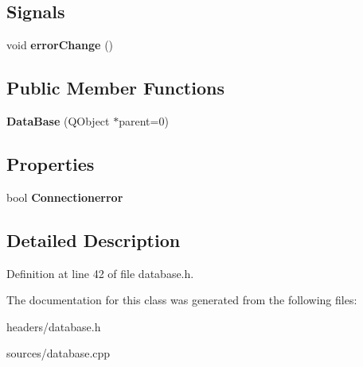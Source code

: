 \subsection*{Signals}
\begin{DoxyCompactItemize}
\item 
\mbox{\label{class_data_base_a8890efbd2c70b08529079cd2b45c85ba}} 
void {\bfseries error\+Change} ()
\end{DoxyCompactItemize}
\subsection*{Public Member Functions}
\begin{DoxyCompactItemize}
\item 
\mbox{\label{class_data_base_af4276b07c4049897ecbfe4842d25ba02}} 
{\bfseries Data\+Base} (Q\+Object $\ast$parent=0)
\end{DoxyCompactItemize}
\subsection*{Properties}
\begin{DoxyCompactItemize}
\item 
\mbox{\label{class_data_base_aef16708ec124b90da338ec222c4dc608}} 
bool {\bfseries Connectionerror}
\end{DoxyCompactItemize}


\subsection{Detailed Description}


Definition at line 42 of file database.\+h.



The documentation for this class was generated from the following files\+:\begin{DoxyCompactItemize}
\item 
headers/database.\+h\item 
sources/database.\+cpp\end{DoxyCompactItemize}
